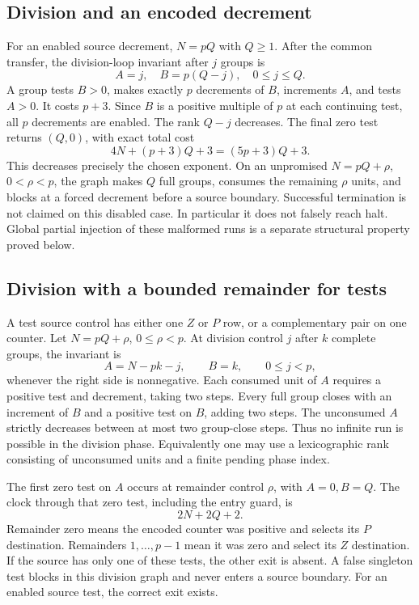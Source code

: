 \documentclass[11pt,a4paper]{article}
\numberwithin{equation}{section}
\begin{document}
\subsection{Division and an encoded decrement}
For an enabled source decrement, $N=pQ$ with $Q\ge1$. After the common
transfer, the division-loop invariant after $j$ groups is
\[
                     A=j,\quad B=p(Q-j),\quad0\le j\le Q.\tag{16}
\]
A group tests $B>0$, makes exactly $p$ decrements of $B$, increments $A$,
and tests $A>0$. It costs $p+3$. Since $B$ is a positive multiple of $p$
at each continuing test, all $p$ decrements are enabled. The rank $Q-j$
decreases. The final zero test returns $(Q,0)$, with exact total cost
\[
                  4N+(p+3)Q+3=(5p+3)Q+3.              \tag{17}
\]
This decreases precisely the chosen exponent. On an unpromised
$N=pQ+\rho$, $0<\rho<p$, the graph makes $Q$ full groups, consumes the
remaining $\rho$ units, and blocks at a forced decrement before a source
boundary. Successful termination is not claimed on this disabled case.
In particular it does not falsely reach halt. Global partial injection of
these malformed runs is a separate structural property proved below.

\subsection{Division with a bounded remainder for tests}
A test source control has either one $Z$ or $P$ row, or a complementary pair
on one counter. Let $N=pQ+\rho$, $0\le\rho<p$. At division control $j$
after $k$ complete groups, the invariant is
\[
              A=N-pk-j,\qquad B=k,\qquad0\le j<p,       \tag{18}
\]
whenever the right side is nonnegative. Each consumed unit of $A$ requires a
positive test and decrement, taking two steps. Every full group closes with
an increment of $B$ and a positive test on $B$, adding two steps. The
unconsumed $A$ strictly decreases between at most two group-close steps.
Thus no infinite run is possible in the division phase. Equivalently one may
use a lexicographic rank consisting of unconsumed units and a finite pending
phase index.

The first zero test on $A$ occurs at remainder control $\rho$, with
$A=0,B=Q$. The clock through that zero test, including the entry guard, is
\[
                            2N+2Q+2.                  \tag{19}
\]
Remainder zero means the encoded counter was positive and selects its $P$
destination. Remainders $1,\ldots,p-1$ mean it was zero and select its $Z$
destination. If the source has only one of these tests, the other exit is
absent. A false singleton test blocks in this division graph and never enters
a source boundary. For an enabled source test, the correct exit exists.
\end{document}
